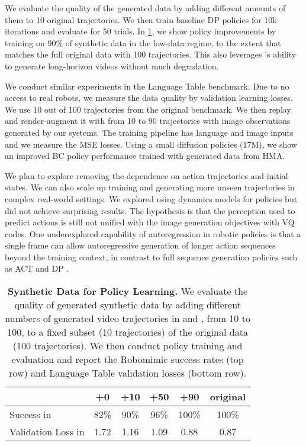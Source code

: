 We evaluate the quality of the generated data by adding different amounts of them to 10 original trajectories. We then train baseline DP policies for 10k iterations and evaluate for 50 trials.
In \cref{table:synthetic_data}, we show policy improvements by training on 90\% of synthetic data in the low-data regime, to the extent that matches the full original data with 100 trajectories. This also leverages \ourshort's ability to generate long-horizon videos without much degradation.  

We conduct similar experiments in the Language Table \cite{lynch2023interactive} benchmark. Due to no access to real robots, we measure the data quality 
by validation learning losses. We use 10 out of 100 
trajectories from the original benchmark. We then replay and render-augment it with \ourshort from 10 to 90 trajectories with image observations generated by our systems. The training pipeline has language and image inputs and we measure the MSE losses. Using a small diffusion policies (17M), we show an improved BC policy performance trained with generated data from HMA.



We plan to explore removing the dependence on action trajectories and initial states. We can also scale up training and generating more unseen trajectories in complex real-world settings. We explored using dynamics models for policies but did not achieve surprising results. The hypothesis is that the perception used to 
predict actions is still not unified with the image generation 
objectives with VQ codes.  One underexplored capability   of autoregression in robotic policies is that a single frame can allow autoregressive generation of longer action sequences beyond the training context, in contrast to full sequence generation policies such as ACT \cite{zhao2023learning} and DP \cite{chi2023diffusion}. 

 
\begin{table}[t]
\centering
\small
{}
\begin{tabular}{l|ccccc}
& +0 & +10 & +50  & +90 & original \\ 
\hline
{Success in \cite{robomimic2021}} & 82\% &  90\% & 96\%& 100\% & 100\%   \\
{Validation Loss in \cite{lynch2023interactive}} &  1.72  & 1.16   & 1.09  &  0.88 & 0.87 
\end{tabular}
\caption{\textbf{Synthetic Data for Policy Learning.} We evaluate the quality of generated synthetic data by adding different numbers of generated video trajectories in \cite{robomimic2021} and \cite{lynch2023interactive}, from 10 to 100, to a fixed subset (10 trajectories) of the original data (100 trajectories). We then conduct policy training and evaluation and report the Robomimic success rates (top row) and Language Table validation losses (bottom row).  }
\label{table:synthetic_data}
\end{table}

